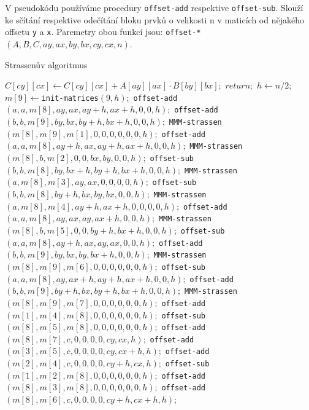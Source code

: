 V pseudokódu používáme procedury \texttt{offset-add} respektive \texttt{offset-sub}. Slouží ke sčítání respektive odečítání bloku prvků o velikosti n v maticích od nějakého offsetu \texttt{y} a \texttt{x}. Paremetry obou funkcí jsou: \texttt{offset-*}$(A,B,C,ay,ax,by,bx,cy,cx,n)$. 

\begin{algorithm}[H]
	\caption{Strassenův algoritmus}\label{mmm-strassen}
	\begin{algorithmic}[1]
			\State \texttt{$C[cy][cx]\gets C[cy][cx] + A[ay][ax] \cdot B[by][bx];$}
			\State \texttt{$return;$}
		\EndIf
  		\State \texttt{$h \gets n/2;$} 
  		\State \texttt{$m[9] \gets $init-matrices$(9, h);$} 
	\State \texttt{offset-add$(a, a, m[8], ay, ax, ay + h, ax + h, 0, 0, h);$} 
	\State \texttt{offset-add$(b, b, m[9], by, bx, by + h, bx + h, 0, 0, h);$}
	\State \texttt{MMM-strassen$(m[8], m[9], m[1], 0, 0, 0, 0, 0, 0, h);$}
%	
	\State \texttt{offset-add$(a, a, m[8], ay + h, ax, ay + h, ax + h, 0, 0, h);$} 
	\State \texttt{MMM-strassen$(m[8], b, m[2], 0, 0, bx, by, 0, 0, h);$}
%	
	\State \texttt{offset-sub$(b, b, m[8], by, bx + h, by + h, bx + h, 0, 0, h);$} 
	\State \texttt{MMM-strassen$(a, m[8], m[3], ay, ax, 0, 0, 0, 0, h);$}
%	
	\State \texttt{offset-sub$(b, b, m[8], by + h, bx, by, bx, 0, 0, h);$} 
	\State \texttt{MMM-strassen$(a, m[8], m[4], ay + h, ax + h, 0, 0, 0, 0, h);$}
%	
	\State \texttt{offset-add$(a, a, m[8], ay, ax, ay, ax + h, 0, 0, h);$} 
	\State \texttt{MMM-strassen$(m[8], b, m[5], 0, 0, by + h, bx + h, 0, 0, h);$}
%	
	\State \texttt{offset-sub$(a, a, m[8], ay + h, ax, ay, ax, 0, 0, h);$} 
	\State \texttt{offset-add$(b, b, m[9], by, bx, by, bx + h, 0, 0, h);$}
	\State \texttt{MMM-strassen$(m[8], m[9], m[6], 0, 0, 0, 0, 0, 0, h);$}
%	
	\State \texttt{offset-sub$(a, a, m[8], ay, ax + h, ay + h, ax + h, 0, 0, h);$} 
	\State \texttt{offset-add$(b, b, m[9], by + h, bx, by + h, bx + h, 0, 0, h);$}
	\State \texttt{MMM-strassen$(m[8], m[9], m[7], 0, 0, 0, 0, 0, 0, h);$}
%	
	\State \texttt{offset-add$(m[1], m[4], m[8], 0, 0, 0, 0, 0, 0, h);$} 
	\State \texttt{offset-sub$(m[8], m[5], m[8], 0, 0, 0, 0, 0, 0, h);$}
	\State \texttt{offset-add$(m[8], m[7], c, 0, 0, 0, 0, cy, cx, h);$}
%	
	\State \texttt{offset-add$(m[3], m[5], c, 0, 0, 0, 0, cy, cx + h, h);$} 
%	
	\State \texttt{offset-add$(m[2], m[4], c, 0, 0, 0, 0, cy + h, cx, h);$} 
%	
	\State \texttt{offset-sub$(m[1], m[2], m[8], 0, 0, 0, 0, 0, 0, h);$} 
	\State \texttt{offset-add$(m[8], m[3], m[8], 0, 0, 0, 0, 0, 0, h);$}
	\State \texttt{offset-add$(m[8], m[6], c, 0, 0, 0, 0, cy + h, cx + h, h);$}		
		\EndProcedure
	\end{algorithmic}
\end{algorithm}


